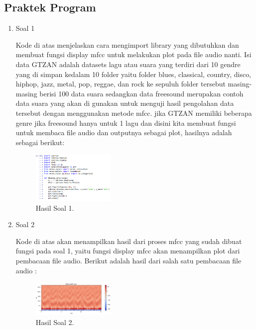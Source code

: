 \subsection{Praktek Program}
\begin{enumerate}
	\item Soal 1
	\hfill\break
	
	Kode di atas menjelaskan cara mengimport library yang dibutuhkan dan membuat fungsi display mfcc untuk melakukan plot pada file audio nanti. Isi data GTZAN adalah datasets lagu atau suara yang terdiri dari 10 gendre yang di simpan kedalam 10 folder yaitu folder blues, classical, country, disco, hiphop, jazz, metal, pop, reggae, dan rock ke sepuluh folder tersebut masing-masing  berisi 100 data suara sedangkan data freesound merupakan contoh data suara yang akan di gunakan untuk menguji hasil pengolahan data tersebut dengan menggunakan metode mfcc. jika GTZAN memiliki beberapa genre jika freesound hanya untuk 1 lagu dan disini kita membuat fungsi untuk membaca file audio dan outputnya sebagai plot, hasilnya adalah sebagai berikut:
	\begin{figure}[H]
	\centering
		\includegraphics[width=4cm]{figures/1174077/6/8.png}
		\caption{Hasil Soal 1.}
	\end{figure}

	\item Soal 2
	\hfill\break
	
	Kode di atas akan menampilkan hasil dari proses mfcc yang sudah dibuat fungsi pada soal 1, yaitu fungsi display mfcc akan menampilkan plot dari pembacaan file audio. Berikut adalah hasil dari salah satu pembacaan file audio :
	\begin{figure}[H]
	\centering
		\includegraphics[width=4cm]{figures/1174077/6/9.png}
		\caption{Hasil Soal 2.}
	\end{figure}


\end{enumerate}
